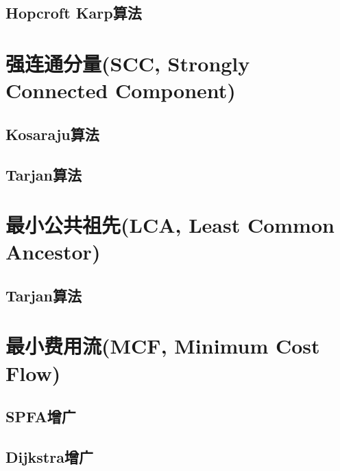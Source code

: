 \subsection{Hopcroft Karp算法}

\section{强连通分量(SCC, Strongly Connected Component)}
\subsection{Kosaraju算法}
\subsection{Tarjan算法}

\section{最小公共祖先(LCA, Least Common Ancestor)}
\subsection{Tarjan算法}

\section{最小费用流(MCF, Minimum Cost Flow)}
\subsection{SPFA增广}
\subsection{Dijkstra增广}
